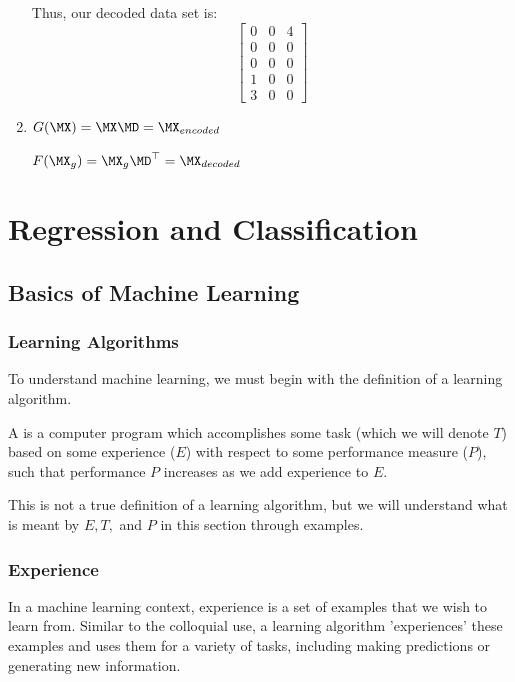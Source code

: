 \begin{enumerate}
Thus, our decoded data set is:
$$\begin{bmatrix} 0 & 0 & 4\\ 0 & 0 & 0\\ 0 & 0 & 0\\ 1 & 0 & 0\\ 3 & 0 & 0 \end{bmatrix}$$
    \item $G(\MX) = \MX\MD = \MX_{encoded}$

$F(\MX_g) = \MX_g\MD^\top = \MX_{decoded}$
\end{enumerate}

\chapter{Regression and Classification} 

\section{Basics of Machine Learning}
\subsection{Learning Algorithms}\label{learning-algs}

To understand machine learning, we must begin with the definition of a learning algorithm.

\begin{definition}
A  is a computer program which accomplishes some task (which we will denote $T$) based on some experience ($E$) with respect to some performance measure ($P$), such that performance $P$ increases as we add experience to $E$.
\end{definition}

\begin{remark}
    This is not a true definition of a learning algorithm, but we will understand what is meant by $E, T,$ and $P$ in this section through examples.
\end{remark}

\subsection{Experience}

In a machine learning context, experience is a set of examples that we wish to learn from. Similar to the colloquial use, a learning algorithm 'experiences' these examples and uses them for a variety of tasks, including making predictions or generating new information. 

